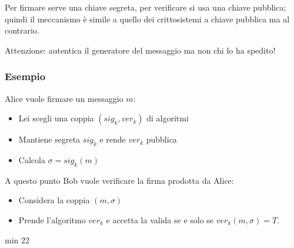 Per firmare serve una chiave segreta, per verificare si usa una chiave pubblica; quindi il meccanismo è simile a quello dei crittosistemi a chiave pubblica ma al contrario.

Attenzione: autentica il generatore del messaggio ma non chi lo ha spedito!

\subsubsection*{Esempio}
Alice vuole firmare un messaggio $m$:
\begin{itemize}
	\item Lei scegli una coppia $(sig_k, ver_k)$ di algoritmi
	\item Mantiene segreta $sig_k$ e rende $ver_k$ pubblica
	\item Calcola $\sigma=sig_k(m)$
\end{itemize}
A questo punto Bob vuole verificare la firma prodotta da Alice:
\begin{itemize}
	\item Considera la coppia $(m, \sigma)$
	\item Prende l'algoritmo $ver_k$ e accetta la valida se e solo se $ver_k(m, \sigma) = T$.
\end{itemize}

min 22